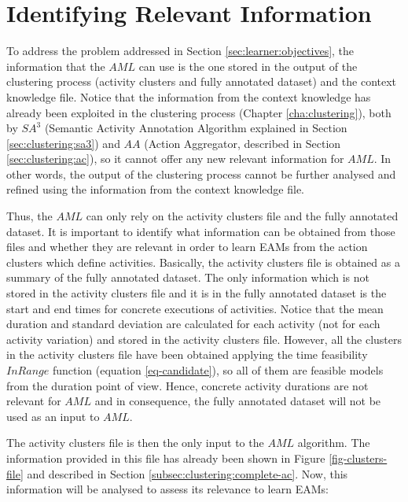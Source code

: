 \section{Identifying Relevant Information}
\label{sec:learner:relevant}


To address the problem addressed in Section \ref{sec:learner:objectives}, the information that the $AML$ can use is the one stored in the output of the clustering process (activity clusters and fully annotated dataset) and the context knowledge file. Notice that the information from the context knowledge has already been exploited in the clustering process (Chapter \ref{cha:clustering}), both by $SA^3$ (Semantic Activity Annotation Algorithm explained in Section \ref{sec:clustering:sa3}) and $AA$ (Action Aggregator, described in Section \ref{sec:clustering:ac}), so it cannot offer any new relevant information for $AML$. In other words, the output of the clustering process cannot be further analysed and refined using the information from the context knowledge file.

Thus, the $AML$ can only rely on the activity clusters file and the fully annotated dataset. It is important to identify what information can be obtained from those files and whether they are relevant in order to learn EAMs from the action clusters which define activities. Basically, the activity clusters file is obtained as a summary of the fully annotated dataset. The only information which is not stored in the activity clusters file and it is in the fully annotated dataset is the start and end times for concrete executions of activities. Notice that the mean duration and standard deviation are calculated for each activity (not for each activity variation) and stored in the activity clusters file. However, all the clusters in the activity clusters file have been obtained applying the time feasibility $InRange$ function (equation \ref{eq-candidate}), so all of them are feasible models from the duration point of view. Hence, concrete activity durations are not relevant for $AML$ and in consequence, the fully annotated dataset will not be used as an input to $AML$.

The activity clusters file is then the only input to the $AML$ algorithm. The information provided in this file has already been shown in Figure \ref{fig-clusters-file} and described in Section \ref{subsec:clustering:complete-ac}. Now, this information will be analysed to assess its relevance to learn EAMs:

